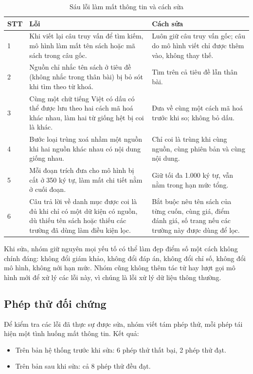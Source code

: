\begin{table}[!htbp]
\caption{Sáu lỗi làm mất thông tin và cách sửa}
\label{tab:sau-loi}
\cobang
\begin{tabularx}{\linewidth}{C{1.1cm}YY}
\toprule
\textbf{STT} & \textbf{Lỗi} & \textbf{Cách sửa}\\
 & Khi viết lại câu truy vấn để tìm kiếm, mô hình làm mất tên sách hoặc mã sách trong câu gốc. & Luôn giữ câu truy vấn gốc; câu do mô hình viết chỉ được thêm vào, không thay thế.\\
2 & Nguồn chỉ nhắc tên sách ở tiêu đề (không nhắc trong thân bài) bị bỏ sót khi tìm theo từ khoá. & Tìm trên cả tiêu đề lẫn thân bài.\\
3 & Cùng một chữ tiếng Việt có dấu có thể được lưu theo hai cách mã hoá khác nhau, làm hai từ giống hệt bị coi là khác. & Đưa về cùng một cách mã hoá trước khi so; không bỏ dấu.\\
4 & Bước loại trùng xoá nhầm một nguồn khi hai nguồn khác nhau có nội dung giống nhau. & Chỉ coi là trùng khi cùng nguồn, cùng phiên bản và cùng nội dung.\\
5 & Mỗi đoạn trích đưa cho mô hình bị cắt ở 350 ký tự, làm mất chi tiết nằm ở cuối đoạn. & Giữ tối đa 1.000 ký tự, vẫn nằm trong hạn mức tổng.\\
6 & Câu trả lời về danh mục được coi là đủ khi chỉ có một dữ kiện có nguồn, dù thiếu tên sách hoặc thiếu các trường đã dùng làm điều kiện lọc. & Bắt buộc nêu tên sách của từng cuốn, cùng giá, điểm đánh giá, số trang nếu các trường này được dùng để lọc.\\
\bottomrule
\end{tabularx}
\end{table}

Khi sửa, nhóm giữ nguyên mọi yếu tố có thể làm đẹp điểm số một cách không chính đáng: không đổi giám khảo, không đổi đáp án, không đổi chỉ số, không đổi mô hình, không nới hạn mức. Nhóm cũng không thêm tác tử hay lượt gọi mô hình mới để xử lý các lỗi này, vì chúng là lỗi xử lý dữ liệu thông thường.

\subsection{Phép thử đối chứng}

Để kiểm tra các lỗi đã thực sự được sửa, nhóm viết tám phép thử, mỗi phép tái hiện một tình huống mất thông tin. Kết quả:

\begin{itemize}
    \item Trên bản hệ thống trước khi sửa: 6 phép thử thất bại, 2 phép thử đạt.
    \item Trên bản sau khi sửa: cả 8 phép thử đều đạt.
\end{itemize}

